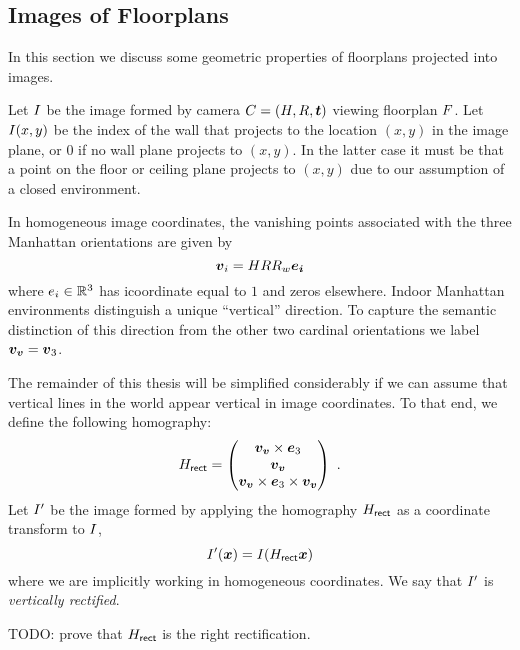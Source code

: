 \subsection{Images of Floorplans}

In this section we discuss some geometric properties of floorplans
projected into images. 

Let $\Image$ be the image formed by camera
$\Camera=(\CamMatrix,\CamR,\CamTr)$ viewing floorplan
$\Floorplan$. Let $\Image(x,y)$ be the index of the wall that projects
to the location $(x,y)$ in the image plane, or 0 if no wall plane
projects to $(x,y)$. In the latter case it must be that a point on the
floor or ceiling plane projects to $(x,y)$ due to our assumption of a
closed environment.

In homogeneous image coordinates, the vanishing points associated with
the three Manhattan orientations are given by
\begin{equation}
  \vpt_i = \CamMatrix \CamR \SceneR \vect{e_i}
\end{equation}
where $e_i \in \Rthree$ has i\th coordinate equal to $1$ and zeros
elsewhere. Indoor Manhattan environments distinguish a unique
``vertical'' direction. To capture the semantic distinction of this
direction from the other two cardinal orientations we label $\vvpt =
\vpt_3$.

The remainder of this thesis will be simplified considerably if we can
assume that vertical lines in the world appear vertical in image
coordinates. To that end, we define the following homography:
\begin{equation}
  \label{eq:rectifier}
  \Rectifier =
  \begin{pmatrix}
    \vvpt \times \ez \\
    \vvpt \\
    \vvpt \times \ez \times \vvpt
  \end{pmatrix} ~.
\end{equation}
Let $\Image'$ be the image formed by applying the homography $\Rectifier$ as a
coordinate transform to $\Image$,
\begin{equation}
  \label{eq:rectification}
  \Image'(\vect{x}) = \Image(\Rectifier \vect{x})
\end{equation}
where we are implicitly working in homogeneous coordinates. We say
that $\Image'$ is \textit{vertically rectified}.

TODO: prove that $\Rectifier$ is the right rectification.

